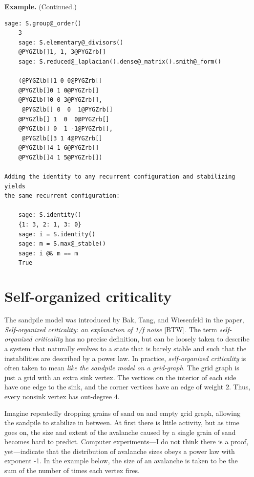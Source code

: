 \documentclass[letterpaper,10pt,english]{manual}
\begin{document}
\textbf{Example.} (Continued.)

\begin{Verbatim}[commandchars=@\[\]]
    sage: S.group@_order()
    3
    sage: S.elementary@_divisors()
    @PYGZlb[]1, 1, 3@PYGZrb[]
    sage: S.reduced@_laplacian().dense@_matrix().smith@_form()

    (@PYGZlb[]1 0 0@PYGZrb[]
    @PYGZlb[]0 1 0@PYGZrb[]
    @PYGZlb[]0 0 3@PYGZrb[],
     @PYGZlb[] 0  0  1@PYGZrb[]
    @PYGZlb[] 1  0  0@PYGZrb[]
    @PYGZlb[] 0  1 -1@PYGZrb[],
     @PYGZlb[]3 1 4@PYGZrb[]
    @PYGZlb[]4 1 6@PYGZrb[]
    @PYGZlb[]4 1 5@PYGZrb[])

Adding the identity to any recurrent configuration and stabilizing yields
the same recurrent configuration:

    sage: S.identity()
    {1: 3, 2: 1, 3: 0}
    sage: i = S.identity()
    sage: m = S.max@_stable()
    sage: i @& m == m
    True
\end{Verbatim}


\section{Self-organized criticality}

The sandpile model was introduced by Bak, Tang, and Wiesenfeld in the paper,
\emph{Self-organized criticality: an explanation of 1/ƒ noise} {[}BTW{]}.  The term
\emph{self-organized criticality} has no precise definition, but can be
loosely taken to describe a system that naturally evolves to a state that is
barely stable and such that the instabilities are described by a power law.
In practice, \emph{self-organized criticality} is often taken to mean \emph{like the
sandpile model on a grid-graph}.  The grid graph is just a grid with an extra
sink vertex.  The vertices on the interior of each side have one edge to the
sink, and the corner vertices have an edge of weight $2$.  Thus, every nonsink
vertex has out-degree $4$.

Imagine repeatedly dropping grains of sand on and empty grid graph, allowing
the sandpile to stabilize in between.  At first there is little activity, but
as time goes on, the size and extent of the avalanche caused by a single grain
of sand becomes hard to predict.  Computer experiments---I do not think there
is a proof, yet---indicate that the distribution of avalanche sizes obeys a
power law with exponent -1.  In the example below, the size of an avalanche is
taken to be the sum of the number of times each vertex fires.
\end{document}
